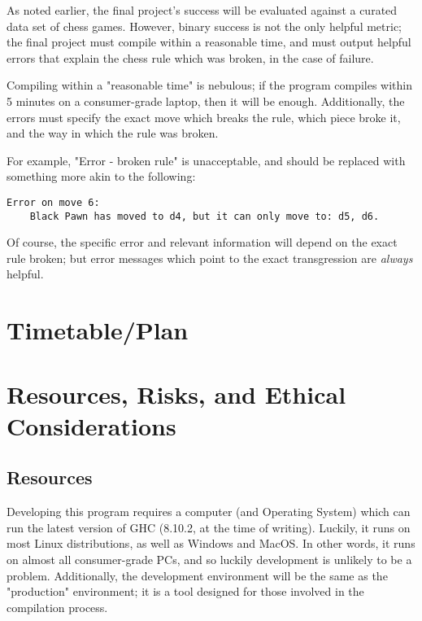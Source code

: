 \documentclass[12pt, a4paper]{scrartcl}
\begin{document}
As noted earlier, the final project's success will be evaluated against a curated data set of chess games. However, binary success is not the only helpful metric; the final project must compile within a reasonable time, and must output helpful errors that explain the chess rule which was broken, in the case of failure.

Compiling within a "reasonable time" is nebulous; if the program compiles within 5 minutes on a consumer-grade laptop, then it will be enough. Additionally, the errors must specify the exact move which breaks the rule, which piece broke it, and the way in which the rule was broken.

For example, "Error - broken rule" is unacceptable, and should be replaced with something more akin to the following:

\begin{lstlisting}
Error on move 6:
    Black Pawn has moved to d4, but it can only move to: d5, d6.
\end{lstlisting}

Of course, the specific error and relevant information will depend on the exact rule broken; but error messages which point to the exact transgression are \emph{always} helpful.

\section{Timetable/Plan}


\section{Resources, Risks, and Ethical Considerations}

\subsection{Resources}

Developing this program requires a computer (and Operating System) which can run the latest version of GHC (8.10.2, at the time of writing). Luckily, it runs on most Linux distributions, as well as Windows and MacOS. In other words, it runs on almost all consumer-grade PCs, and so luckily development is unlikely to be a problem. Additionally, the development environment will be the same as the "production" environment; it is a tool designed for those involved in the compilation process.
\end{document}
